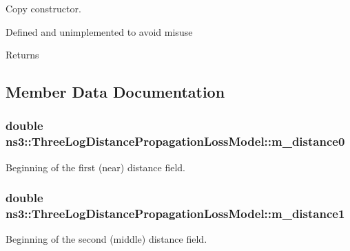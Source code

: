 Copy constructor. 

Defined and unimplemented to avoid misuse \begin{DoxyReturn}{Returns}

\end{DoxyReturn}


\subsection{Member Data Documentation}
\subsubsection[{\texorpdfstring{m\+\_\+distance0}{m_distance0}}]{\setlength{\rightskip}{0pt plus 5cm}double ns3\+::\+Three\+Log\+Distance\+Propagation\+Loss\+Model\+::m\+\_\+distance0\hspace{0.3cm}{\ttfamily [private]}}\hypertarget{classns3_1_1ThreeLogDistancePropagationLossModel_a47d290dc3c7638585677fc3611155997}{}\label{classns3_1_1ThreeLogDistancePropagationLossModel_a47d290dc3c7638585677fc3611155997}


Beginning of the first (near) distance field. 

\subsubsection[{\texorpdfstring{m\+\_\+distance1}{m_distance1}}]{\setlength{\rightskip}{0pt plus 5cm}double ns3\+::\+Three\+Log\+Distance\+Propagation\+Loss\+Model\+::m\+\_\+distance1\hspace{0.3cm}{\ttfamily [private]}}\hypertarget{classns3_1_1ThreeLogDistancePropagationLossModel_a7d3860fbf9e870e531347f5dbde5e586}{}\label{classns3_1_1ThreeLogDistancePropagationLossModel_a7d3860fbf9e870e531347f5dbde5e586}


Beginning of the second (middle) distance field. 

